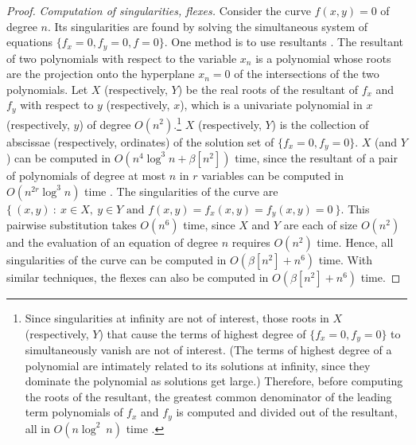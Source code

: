 \begin{proof}
{\em Computation of singularities, flexes.} 
%
Consider the curve $f(x,y) = 0$ of degree $n$.
Its singularities are found by solving the simultaneous system
of equations \mbox{$\{f_{x} = 0, f_{y}=0, f = 0\}$}.
One method is to use resultants \cite{walker}.
The resultant of two polynomials with respect to the variable $x_{n}$ is a polynomial
whose roots are the projection onto the hyperplane $x_{n} = 0$
of the intersections of the two polynomials.
Let $X$ (respectively, $Y$) be the real roots of the resultant of $f_{x}$ and $f_{y}$ 
with respect to $y$ (respectively, $x$), which is a univariate polynomial in $x$ 
(respectively, $y$)
of degree $O(n^{2})$.\footnote{Since 
	singularities at infinity are not of interest, those roots in $X$ (respectively, $Y$)
	that cause the terms of highest degree of \mbox{$\{f_{x} = 0, f_{y}=0\}$} to 
	simultaneously vanish are not of interest.
	(The terms of highest degree of a polynomial are intimately related to its 
	solutions at infinity, since they dominate the polynomial as solutions get large.)
	Therefore, before computing the roots of the resultant, the 
	greatest common denominator of the leading term
	polynomials of $f_{x}$ and $f_{y}$ is computed and divided out of the 
	resultant, all in $O(n\log^{2}\ n)$ time \cite{ahu}.}
$X$ (respectively, $Y$) is the collection of abscissae (respectively, ordinates)
of the solution set of \mbox{$\{f_{x} = 0, f_{y}=0\}$}.
$X$ (and $Y$) can be computed in $O(n^{4}\log^{3}n + \beta[n^{2}])$ time, since
the resultant of a pair of polynomials of degree at most $n$ in $r$ variables 
can be computed in $O(n^{2r}\log^{3}n)$ time \cite{bajj}.
The singularities of the curve are
\mbox{$\{\ (x,y)\ :\ x\in X,\ y \in Y \mbox{ and } f(x,y) = f_{x}(x,y) = f_{y}(x,y) = 
0\ \}$.}
This pairwise substitution takes $O(n^{6})$ 
time, since $X$ and $Y$ are each of size $O(n^{2})$ and the evaluation of an equation of 
degree $n$ requires $O(n^{2})$ time.
Hence, all singularities of the curve can be computed in $O(\beta[n^{2}] + n^{6})$
time.
With similar techniques, the flexes can also be computed in $O(\beta[n^{2}] + n^{6})$
time.


\end{proof}
